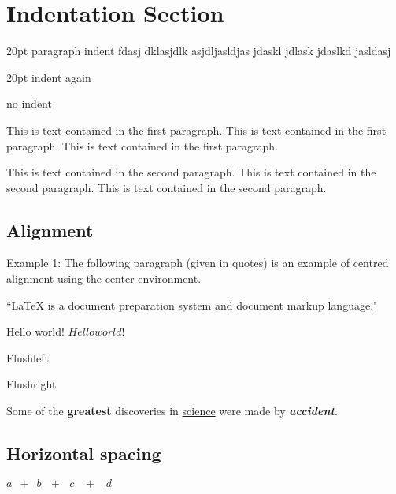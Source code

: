 \documentclass[12pt, letterpaper]{article}
\begin{document}
\section*{Indentation Section}

\setlength{\parindent}{20pt}

20pt paragraph indent fdasj dklasjdlk asjdljasldjas jdaskl jdlask jdaslkd jasldasj

20pt indent again

\setlength{\parindent}{0pt}

no indent



This is text contained in the first paragraph. 
This is text contained in the first paragraph. 
This is text contained in the first paragraph.\par
This is text contained in the second paragraph. 
This is text contained in the second paragraph.
This is text contained in the second paragraph.


\subsection*{Alignment}

\begin{center}
Example 1: The following paragraph (given in quotes) is an 
example of centred alignment using the center environment. 

``La\TeX{} is a document preparation system and document markup 
language."
\end{center}



Hello world!
$Hello world!$ %


\begin{flushleft}
Flushleft
\end{flushleft}

\begin{flushright}
Flushright
\end{flushright}

Some of the \textbf{greatest}
discoveries in \underline{science} 
were made by \textbf{\textit{accident}}.



\subsection*{Horizontal spacing}

$a \,\,\, + \,\,\, b \:\:\:  + \:\:\: c \;\;\; + \;\;\; d $
\end{document}
